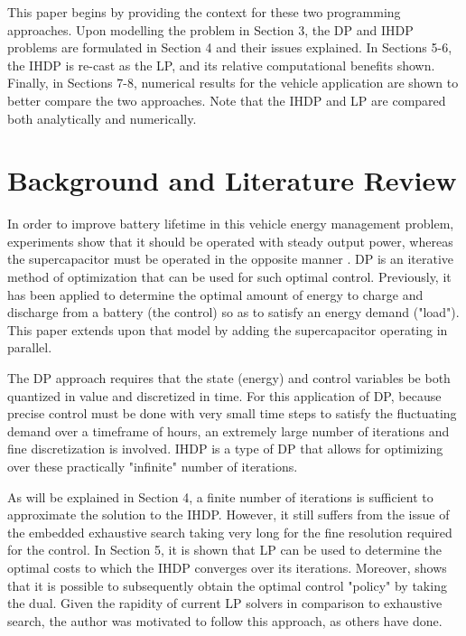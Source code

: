 \documentclass[conference]{IEEEtran}
\begin{document}
This paper begins by providing the context for these two programming approaches. Upon modelling the problem in Section 3, the DP and IHDP problems are formulated in Section 4 and their issues explained. In Sections 5-6, the IHDP is re-cast as the LP, and its relative computational benefits shown. Finally, in Sections 7-8, numerical results for the vehicle application are shown to better compare the two approaches. Note that the IHDP and LP are compared both analytically and numerically.


\section{Background and Literature Review}
In order to improve battery lifetime in this vehicle energy management problem, experiments \cite{thounthong2009energy} show that it should be operated with steady output power, whereas the supercapacitor must be operated in the opposite manner \cite{thounthong2009energy}. DP is an iterative method of optimization that can be used for such optimal control. Previously\cite{thounthong2009energy}, it has been applied to determine the optimal amount of energy to charge and discharge from a battery (the control) so as to satisfy an energy demand ("load"). This paper extends upon that model by adding the supercapacitor operating in parallel.

The DP approach requires that the state (energy) and control variables be both quantized in value and discretized in time. For this application of DP, because precise control must be done with very small time steps to satisfy the fluctuating demand over a timeframe of hours, an extremely large number of iterations and fine discretization is involved.\cite{bertsekas1995dynamic} IHDP is a type of DP that allows for optimizing over these practically "infinite" number of iterations.

As will be explained in Section 4, a finite number of iterations is sufficient to approximate the solution to the IHDP.\cite{bertsekas1995dynamic} However, it still suffers from the issue of the embedded exhaustive search taking very long for the fine resolution required for the control. In Section 5, it is shown that LP can be used to determine the optimal costs to which the IHDP converges over its iterations.\cite{bertsekas1995dynamic} Moreover, \cite{4220813} shows that it is possible to subsequently obtain the optimal control "policy" by taking the dual. Given the rapidity of current LP solvers in comparison to exhaustive search, the author was motivated to follow this approach, as others have done.
\end{document}
